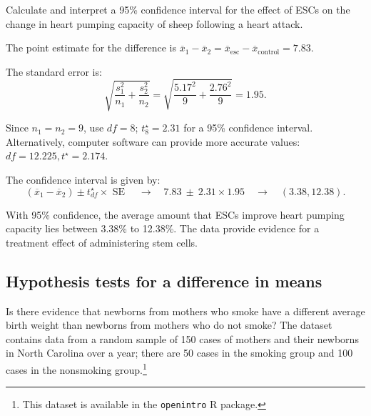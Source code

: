 \begin{examplewrap}
\begin{nexample}{Calculate and interpret a 95\% confidence interval for the effect of ESCs on the change in heart pumping capacity of sheep following a heart attack.}
	
The point estimate for the difference is $\overline{x}_1 - \overline{x}_2 = \overline{x}_{\text{esc}} - \overline{x}_{\text{control}} = 7.83$.	
	
The standard error is:	
\[\sqrt{\frac{s_{1}^2}{n_{1}} + \frac{s_{2}^2}{n_{2}}} = \sqrt{\frac{5.17^2}{9} + \frac{2.76^2}{9}} = 1.95.\]
	
Since $n_1 = n_2 = 9$, use $df = 8$; $t^{\star}_{8} = 2.31$ for a 95\% confidence interval. Alternatively, computer software can provide more accurate values: $df = 12.225, t^\star = 2.174$.

The confidence interval is given by:
\[(\overline{x}_{1} - \overline{x}_{2}) \pm t^\star_{df} \times \text{ SE } \quad\rightarrow\quad
7.83 \ \pm\ 2.31\times 1.95 \quad\rightarrow\quad (3.38, 12.38). \]

With 95\% confidence, the average amount that ESCs improve heart pumping capacity lies between 3.38\% to 12.38\%.\footnotemark{} The data provide evidence for a treatment effect of administering stem cells.
\end{nexample}
\end{examplewrap}


\subsection{Hypothesis tests for a difference in means}
\label{testingDifferenceMeans}




Is there evidence that newborns from mothers who smoke have a different average birth weight than newborns from mothers who do not smoke? The dataset  contains data from a random sample of 150 cases of mothers and their newborns in North Carolina over a year; there are 50 cases in the smoking group and 100 cases in the nonsmoking group.\footnote{This dataset is available in the \texttt{openintro} \textsf{R} package. }

